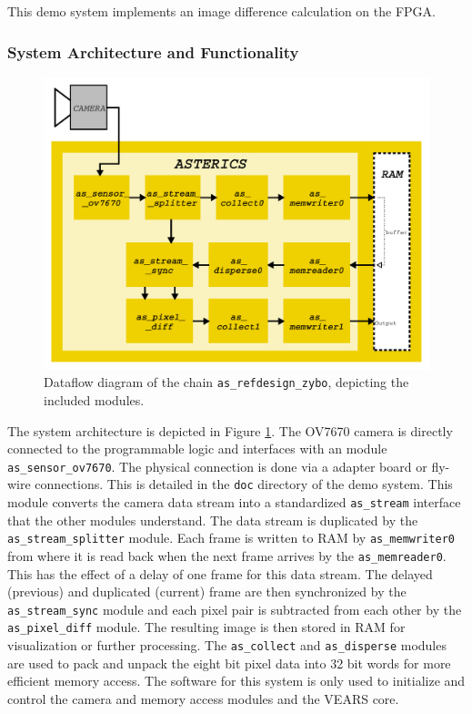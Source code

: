 This demo system implements an image difference calculation on the FPGA.


\subsubsection*{System Architecture and Functionality}

\begin{figure}[htb]
\centering
\includegraphics[width=\textwidth]{figs/09-as_refdesign_zybo_image_differencing.pdf}
\caption{Dataflow diagram of the \asterics chain \texttt{as\_refdesign\_zybo}, depicting the included modules.}
\label{fig:09-image_differencing}
\end{figure}

The system architecture is depicted in Figure \ref{fig:09-image_differencing}.
The OV7670 camera is directly connected to the programmable logic and interfaces with an \asterics module \texttt{as\_sensor\_ov7670}.
The physical connection is done via a adapter board or fly-wire connections.
This is detailed in the \texttt{doc} directory of the demo system.
This module converts the camera data stream into a standardized \texttt{as\_stream} interface that the other modules understand.
The data stream is duplicated by the \texttt{as\_stream\_splitter} module.
Each frame is written to RAM by \texttt{as\_memwriter0} from where it is read back when the next frame arrives by the \texttt{as\_memreader0}.
This has the effect of a delay of one frame for this data stream.
The delayed (previous) and duplicated (current) frame are then synchronized by the \texttt{as\_stream\_sync} module and each pixel pair is subtracted from each other by the \texttt{as\_pixel\_diff} module.
The resulting image is then stored in RAM for visualization or further processing.
The \texttt{as\_collect} and \texttt{as\_disperse} modules are used to pack and unpack the eight bit pixel data into 32 bit words for more efficient memory access.
The software for this system is only used to initialize and control the camera and memory access modules and the VEARS core.

